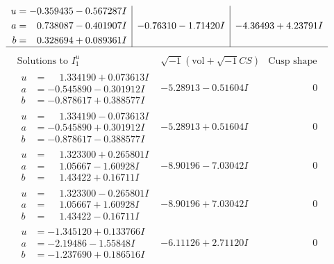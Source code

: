 \documentclass[1p]{elsarticle_modified}
\theoremstyle{definition}
\newcommand{\I}{\sqrt{-1}}
\begin{document}
$$\begin{array}{c|c|c}
\begin{aligned}
u &= -0.359435 - 0.567287 I \\
a &= \phantom{-}0.738087 - 0.401907 I \\
b &= \phantom{-}0.328694 + 0.089361 I\end{aligned}
 & -0.76310 - 1.71420 I & -4.36493 + 4.23791 I\\
 \hline 
 \end{array}$$\newpage$$\begin{array}{c|c|c}  
\text{Solutions to }I^u_{1}& \I (\text{vol} + \sqrt{-1}CS) & \text{Cusp shape}\\
 \hline 
\begin{aligned}
u &= \phantom{-}1.334190 + 0.073613 I \\
a &= -0.545890 - 0.301912 I \\
b &= -0.878617 + 0.388577 I\end{aligned}
 & -5.28913 - 0.51604 I & \phantom{-0.000000 } 0 \\ \hline\begin{aligned}
u &= \phantom{-}1.334190 - 0.073613 I \\
a &= -0.545890 + 0.301912 I \\
b &= -0.878617 - 0.388577 I\end{aligned}
 & -5.28913 + 0.51604 I & \phantom{-0.000000 } 0 \\ \hline\begin{aligned}
u &= \phantom{-}1.323300 + 0.265801 I \\
a &= \phantom{-}1.05667 - 1.60928 I \\
b &= \phantom{-}1.43422 + 0.16711 I\end{aligned}
 & -8.90196 - 7.03042 I & \phantom{-0.000000 } 0 \\ \hline\begin{aligned}
u &= \phantom{-}1.323300 - 0.265801 I \\
a &= \phantom{-}1.05667 + 1.60928 I \\
b &= \phantom{-}1.43422 - 0.16711 I\end{aligned}
 & -8.90196 + 7.03042 I & \phantom{-0.000000 } 0 \\ \hline\begin{aligned}
u &= -1.345120 + 0.133766 I \\
a &= -2.19486 - 1.55848 I \\
b &= -1.237690 + 0.186516 I\end{aligned}
 & -6.11126 + 2.71120 I & \phantom{-0.000000 } 0 \\ \hline\begin{aligned}

\end{aligned}
\end{array}$$
\end{document}
